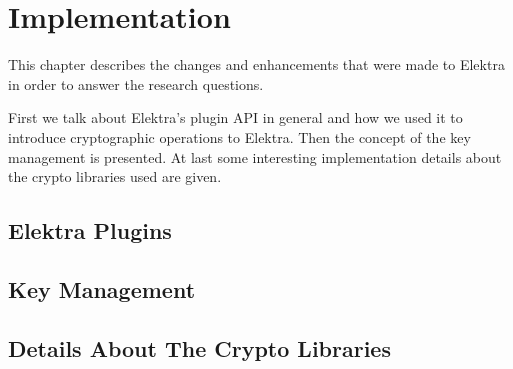 \chapter{Implementation}

This chapter describes the changes and enhancements that were made to Elektra in order to answer the research questions.

First we talk about Elektra's plugin API in general and how we used it to introduce cryptographic operations to Elektra.
Then the concept of the key management is presented.
At last some interesting implementation details about the crypto libraries used are given.

    \section{Elektra Plugins}

    \section{Key Management}

    \section{Details About The Crypto Libraries}
